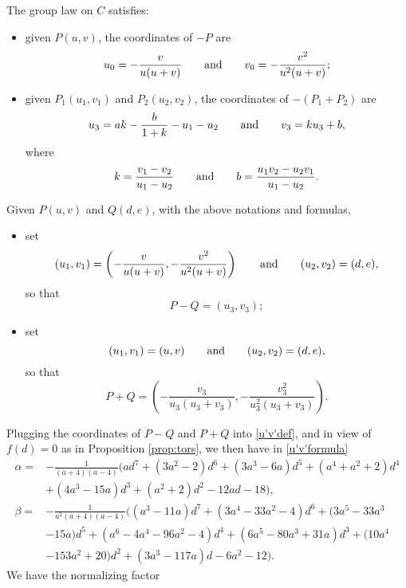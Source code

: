 \documentclass{gtpart}
\theoremstyle{definition}
\theoremstyle{remark}
\newcommand{\ad}{{\rm and}}
\newcommand{\A}{\alpha}
\begin{document}
The group law on $C$ satisfies: 
\begin{itemize}
 \item given $P(u,v)$, the coordinates of $-P$ are 
 \[
  u_0 = -\frac{v}{u (u + v)} \qquad \ad \qquad v_0 = -\frac{v^2}{u^2 (u + v)}; 
 \]

 \item given $P_1(u_1,v_1)$ and $P_2(u_2,v_2)$, the coordinates of $-(P_1 + P_2)$ are 
 \[
  u_3 = a k - \frac{b}{1 + k} - u_1 - u_2 \qquad \ad \qquad v_3 = k u_3 + b, 
 \]
 where 
 \[
  k = \frac{v_1 - v_2}{u_1 - u_2} \qquad \ad \qquad b = \frac{u_1 v_2 - u_2 v_1}{u_1 - u_2}.  
 \]
\end{itemize}
Given $P(u,v)$ and $Q(d,e)$, with the above notations and formulas, 
\begin{itemize}
 \item set 
 \[
  (u_1,v_1) = \left( -\frac{v}{u (u + v)},-\frac{v^2}{u^2 (u + v)} \right) \qquad \ad \qquad (u_2,v_2) = (d,e), 
 \]
 so that 
 \begin{equation}
 \label{P-Q}
  P - Q = (u_3,v_3); 
 \end{equation}

 \item set 
 \[
  (u_1,v_1) = (u,v) \qquad \ad \qquad (u_2,v_2) = (d,e), 
 \]
 so that 
 \begin{equation}
 \label{P+Q}
  P + Q = \left( -\frac{v_3}{u_3 (u_3 + v_3)},-\frac{v_3^2}{u_3^2 (u_3 + v_3)} \right).  
 \end{equation}
\end{itemize}
Plugging the coordinates of $P - Q$ and $P + Q$ into \eqref{u'v'def}, and in view of $f(d) = 0$ as in Proposition \ref{prop:tors}, 
we then have in \eqref{u'v'formula} 
\begin{equation*}
\begin{split}
 \A = & -\frac{1}{(a + 4) (a - 4)} \big( a d^7 + (3 a^2 - 2) d^6 + (3 a^3 - 6 a) d^5 + (a^4 + a^2 + 2) d^4 \\
      & + (4 a^3 - 15 a) d^3 + (a^2 + 2) d^2 - 12 a d -18 \big), \\
 \beta = & -\frac{1}{a^2 (a + 4) (a - 4)} \big( (a^3 - 11 a) d^7 + (3 a^4 - 33 a^2 - 4) d^6 + (3 a^5 - 33 a^3 \\
         & - 15 a) d^5 + (a^6 - 4 a^4 - 96 a^2 - 4) d^4 + (6 a^5 - 80 a^3 + 31 a) d^3 + (10 a^4 \\
         & - 153 a^2 + 20) d^2 + (3 a^3 - 117 a) d - 6 a^2 - 12 \big).  
\end{split}
\end{equation*}
We have the normalizing factor 
\end{document}
